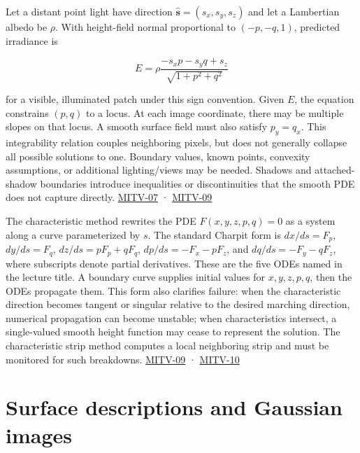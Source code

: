 Let a distant point light have direction \(\hat{\mathbf s}=(s_x,s_y,s_z)\) and let a Lambertian albedo be \(\rho\). With height-field normal proportional to \((-p,-q,1)\), predicted irradiance is

\[
E=\rho\frac{-s_xp-s_yq+s_z}{\sqrt{1+p^2+q^2}}
\]

for a visible, illuminated patch under this sign convention. Given \(E\), the equation constrains \((p,q)\) to a locus. At each image coordinate, there may be multiple slopes on that locus. A smooth surface field must also satisfy \(p_y=q_x\). This integrability relation couples neighboring pixels, but does not generally collapse all possible solutions to one. Boundary values, known points, convexity assumptions, or additional lighting/views may be needed. Shadows and attached-shadow boundaries introduce inequalities or discontinuities that the smooth PDE does not capture directly. \hyperref[04-visual-computing-ii-ch036-mitv-07---gradient-space-reflectance-map-image-irradiance-equation-gnomonic-projection]{MITV-07} · \hyperref[04-visual-computing-ii-ch036-mitv-09---shape-from-shading-general-case---from-first-order-nonlinear-pde-to-five-odes]{MITV-09}

The characteristic method rewrites the PDE \(F(x,y,z,p,q)=0\) as a system along a curve parameterized by \(s\). The standard Charpit form is \(dx/ds=F_p\), \(dy/ds=F_q\), \(dz/ds=pF_p+qF_q\), \(dp/ds=-F_x-pF_z\), and \(dq/ds=-F_y-qF_z\), where subscripts denote partial derivatives. These are the five ODEs named in the lecture title. A boundary curve supplies initial values for \(x,y,z,p,q\), then the ODEs propagate them. This form also clarifies failure: when the characteristic direction becomes tangent or singular relative to the desired marching direction, numerical propagation can become unstable; when characteristics intersect, a single-valued smooth height function may cease to represent the solution. The characteristic strip method computes a local neighboring strip and must be monitored for such breakdowns. \hyperref[04-visual-computing-ii-ch036-mitv-09---shape-from-shading-general-case---from-first-order-nonlinear-pde-to-five-odes]{MITV-09} · \hyperref[04-visual-computing-ii-ch036-mitv-10---characteristic-strip-expansion-shape-from-shading-iterative-solutions]{MITV-10}

\section{Surface descriptions and Gaussian images}\label{04-visual-computing-ii-ch032-surface-descriptions-and-gaussian-images}

